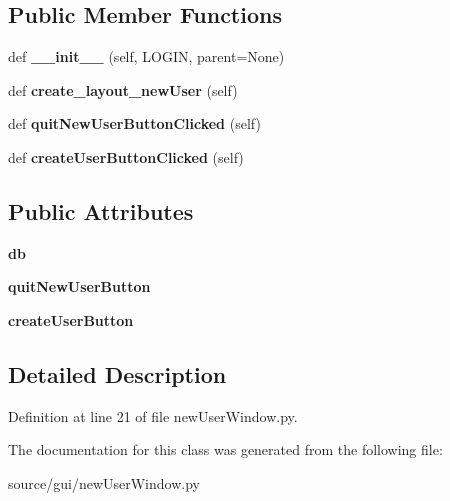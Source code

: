 \subsection*{Public Member Functions}
\begin{DoxyCompactItemize}
\item 
\mbox{\label{classnew_user_window_1_1_new_user_window_a1d9bf03939a173b908aeccc147ea7379}} 
def {\bfseries \+\_\+\+\_\+init\+\_\+\+\_\+} (self, L\+O\+G\+IN, parent=None)
\item 
\mbox{\label{classnew_user_window_1_1_new_user_window_a6cd4260c9a845e2e6f936d574b876907}} 
def {\bfseries create\+\_\+layout\+\_\+new\+User} (self)
\item 
\mbox{\label{classnew_user_window_1_1_new_user_window_a70a34f6a171a19ce09672d109a8f1d80}} 
def {\bfseries quit\+New\+User\+Button\+Clicked} (self)
\item 
\mbox{\label{classnew_user_window_1_1_new_user_window_ae0ece5b86862b79c7f4de00965305dfa}} 
def {\bfseries create\+User\+Button\+Clicked} (self)
\end{DoxyCompactItemize}
\subsection*{Public Attributes}
\begin{DoxyCompactItemize}
\item 
\mbox{\label{classnew_user_window_1_1_new_user_window_aef4af22ad7645f7a250197ff69f71cb2}} 
{\bfseries db}
\item 
\mbox{\label{classnew_user_window_1_1_new_user_window_a0a4a3692820375bcdcbbe6d852b90deb}} 
{\bfseries quit\+New\+User\+Button}
\item 
\mbox{\label{classnew_user_window_1_1_new_user_window_a340e6b9d0f5fc16e4570c7069012fa79}} 
{\bfseries create\+User\+Button}
\end{DoxyCompactItemize}


\subsection{Detailed Description}


Definition at line 21 of file new\+User\+Window.\+py.



The documentation for this class was generated from the following file\+:\begin{DoxyCompactItemize}
\item 
source/gui/new\+User\+Window.\+py\end{DoxyCompactItemize}
